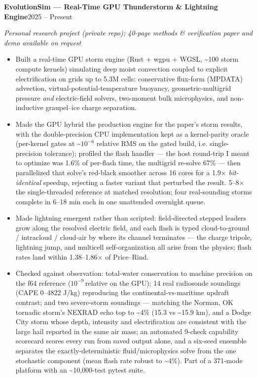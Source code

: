 \documentclass[letterpaper,9pt]{extarticle}
\newcommand{\entry}[2]{%
  \textbf{#1}\hfill#2\par}
\newcommand{\subentry}[2]{%
  \textit{#1}\hfill\textit{#2}\par\vspace{0.2ex}}
\begin{document}
\entry{EvolutionSim --- Real-Time GPU Thunderstorm \& Lightning Engine}{2025 -- Present}
\subentry{Personal research project (private repo); 40-page methods \& verification paper and demo available on request}{}
\begin{itemize}
  \item Built a real-time GPU storm engine (Rust + wgpu + WGSL, \textasciitilde100 storm compute kernels) simulating deep moist convection coupled to explicit electrification on grids up to 5.3M cells: conservative flux-form (MPDATA) advection, virtual-potential-temperature buoyancy, geometric-multigrid pressure \emph{and} electric-field solvers, two-moment bulk microphysics, and non-inductive graupel--ice charge separation.
  \item Made the GPU hybrid the production engine for the paper's storm results, with the double-precision CPU implementation kept as a kernel-parity oracle (per-kernel gates at \textasciitilde$10^{-6}$ relative RMS on the gated build, i.e. single-precision tolerance); profiled the flash handler --- the host round-trip I meant to optimize was 1.6\% of per-flash time, the multigrid re-solve 67\% --- then parallelized that solve's red-black smoother across 16 cores for a 1.9$\times$ \emph{bit-identical} speedup, rejecting a faster variant that perturbed the result. 5--8$\times$ the single-threaded reference at matched resolution; four real-sounding storms complete in 6--18 min each in one unattended overnight queue.
  \item Made lightning emergent rather than scripted: field-directed stepped leaders grow along the resolved electric field, and each flash is typed cloud-to-ground / intracloud / cloud-air by where its channel terminates --- the charge tripole, lightning jump, and multicell self-organization all arise from the physics; flash rates land within 1.38--1.86$\times$ of Price--Rind.
  \item Checked against observation: total-water conservation to machine precision on the f64 reference ($10^{-9}$\,relative on the GPU); 14 real radiosonde soundings (CAPE 0--4822 J/kg) reproducing the continental-vs-maritime updraft contrast; and two severe-storm soundings --- matching the Norman, OK tornadic storm's NEXRAD echo top to \textasciitilde4\% (15.3 vs \textasciitilde15.9 km), and a Dodge City storm whose depth, intensity and electrification are consistent with the large hail reported in the same air mass; an automated 9-check capability scorecard scores every run from saved output alone, and a six-seed ensemble separates the exactly-deterministic fluid/microphysics solve from the one stochastic component (mean flash rate robust to \textasciitilde4\%). Part of a 371-mode platform with an \textasciitilde10{,}000-test pytest suite.
\end{itemize}
\end{document}
